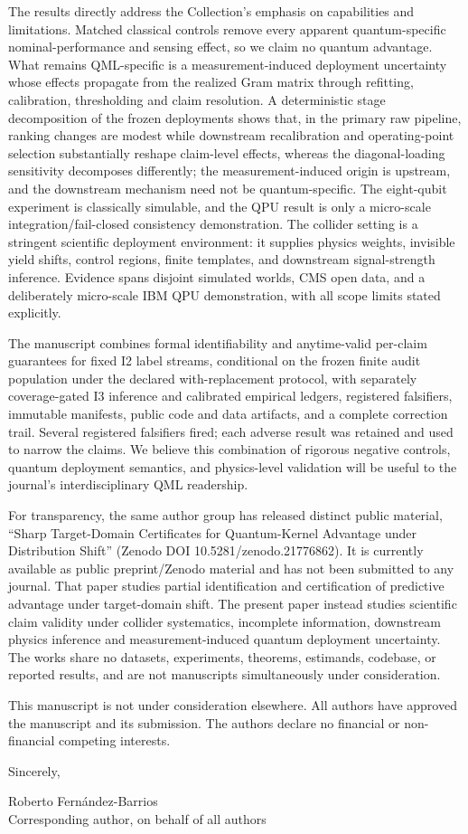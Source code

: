\documentclass[10pt,a4paper]{article}
\begin{document}
The results directly address the Collection's emphasis on capabilities and
limitations. Matched classical controls remove every apparent
quantum-specific nominal-performance and sensing effect, so we claim no
quantum advantage. What remains QML-specific is a measurement-induced deployment
uncertainty whose effects propagate from the realized Gram matrix through
refitting, calibration, thresholding and claim resolution. A deterministic
stage decomposition of the frozen deployments shows that, in the primary raw
pipeline, ranking changes are modest while downstream recalibration and
operating-point selection substantially reshape claim-level effects, whereas
the diagonal-loading sensitivity decomposes differently; the
measurement-induced origin is upstream, and the downstream mechanism need not
be quantum-specific. The eight-qubit
experiment is classically simulable, and the QPU result is only a micro-scale
integration/fail-closed consistency demonstration. The collider setting is a stringent
scientific deployment environment: it supplies physics weights, invisible
yield shifts, control regions, finite templates, and downstream
signal-strength inference. Evidence spans disjoint simulated worlds, CMS open
data, and a deliberately micro-scale IBM QPU demonstration, with all scope
limits stated explicitly.

The manuscript combines formal identifiability and anytime-valid per-claim
guarantees for fixed I2 label streams, conditional on the frozen finite audit
population under the declared with-replacement protocol, with separately
coverage-gated I3 inference and calibrated empirical ledgers, registered falsifiers, immutable
manifests, public code and data artifacts, and a complete correction trail. Several registered
falsifiers fired; each adverse result was retained and used to narrow the
claims. We believe this combination of rigorous negative controls, quantum
deployment semantics, and physics-level validation will be useful to the
journal's interdisciplinary QML readership.

For transparency, the same author group has released distinct public material,
``Sharp Target-Domain Certificates for Quantum-Kernel Advantage under
Distribution Shift'' (Zenodo DOI 10.5281/zenodo.21776862). It is currently
available as public preprint/Zenodo material and has not been submitted to any
journal. That paper studies partial identification and certification of
predictive advantage under target-domain shift. The present paper instead
studies scientific claim validity under collider systematics, incomplete
information, downstream physics inference and measurement-induced quantum
deployment uncertainty. The works share no datasets, experiments, theorems,
estimands, codebase, or reported results, and are not manuscripts
simultaneously under consideration.

This manuscript is not under consideration elsewhere. All authors have
approved the manuscript and its submission. The authors declare no financial
or non-financial competing interests.

Sincerely,

Roberto Fern\'andez-Barrios\\
Corresponding author, on behalf of all authors
\end{document}
